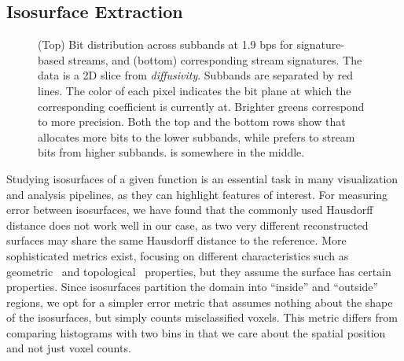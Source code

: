 \subsection{Isosurface Extraction}\label{sec:isocontour}


\begin{figure}[t]
\centering
\caption{(Top) Bit distribution across subbands at 1.9 bps for signature-based streams, and (bottom)
corresponding stream signatures. The data is a 2D slice from \emph{diffusivity}. Subbands are
separated by red lines. The color of each pixel indicates the bit plane at which the corresponding
coefficient is currently at. Brighter greens correspond to more precision. Both the top and the
bottom rows show that \shsg allocates more bits to the lower subbands, while \slsg prefers to stream
bits from higher subbands. \srsg is somewhere in the middle.}
\label{fig:bit-distrib}
\vspace{-1em}
\end{figure}

Studying isosurfaces of a given function is an essential task in many visualization and analysis
pipelines, as they can highlight features of interest. For measuring error between isosurfaces, we
have found that the commonly used Hausdorff distance does not work well in our case, as two very
different reconstructed surfaces may share the same Hausdorff distance to the reference. More
sophisticated metrics exist, focusing on different characteristics such as
geometric~\cite{verifiable-isosurface} and topological~\cite{topology-verification-isosurface}
properties, but they assume the surface has certain properties. Since isosurfaces partition the
domain into ``inside'' and ``outside'' regions, we opt for a simpler error metric that assumes
nothing about the shape of the isosurfaces, but simply counts misclassified voxels. This metric
differs from comparing histograms with two bins in that we care about the spatial position and not
just voxel counts.

